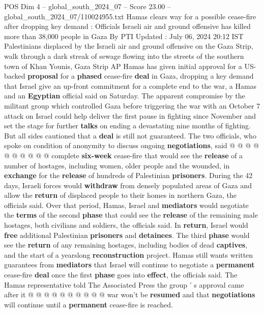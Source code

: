 \begin{textsample}{POS Dim 4 – global\_south\_2024\_07 – Score 23.00 – global\_south\_2024\_07/110024955.txt}  \label{ex:f4_pos_115}
Hamas clears way for a possible cease-fire after dropping key demand : Officials Israeli air and ground offensive has killed more than 38,000 people in Gaza By PTI Updated : July 06, 2024 20:12 IST Palestinians displaced by the Israeli air and ground offensive on the Gaza Strip, walk through a dark streak of sewage flowing into the streets of the southern town of Khan Younis, Gaza Strip AP Hamas has given initial approval for a US-backed \textbf{proposal} for a \textbf{phased} cease-fire \textbf{deal} in Gaza, dropping a key demand that Israel give an up-front commitment for a complete end to the war, a Hamas and an \textbf{Egyptian} official said on Saturday.
The apparent compromise by the militant group which controlled Gaza before triggering the war with an October 7 attack on Israel could help deliver the first pause in fighting since November and set the stage for further \textbf{talks} on ending a devastating nine months of fighting.
But all sides cautioned that a \textbf{deal} is still not guaranteed.
The two officials, who spoke on condition of anonymity to discuss ongoing \textbf{negotiations}, said @ @ @ @ @ @ @ @ @ @ complete \textbf{six-week} cease-fire that would see the \textbf{release} of a number of hostages, including women, older people and the wounded, in \textbf{exchange} for the \textbf{release} of hundreds of Palestinian \textbf{prisoners}.
During the 42 days, Israeli forces would \textbf{withdraw} from densely populated areas of Gaza and allow the \textbf{return} of displaced people to their homes in northern Gaza, the officials said.
Over that period, Hamas, Israel and \textbf{mediators} would negotiate the \textbf{terms} of the second \textbf{phase} that could see the \textbf{release} of the remaining male hostages, both civilians and soldiers, the officials said.
In \textbf{return}, Israel would \textbf{free} additional Palestinian \textbf{prisoners} and \textbf{detainees}.
The third \textbf{phase} would see the \textbf{return} of any remaining hostages, including bodies of dead \textbf{captives}, and the start of a yearslong \textbf{reconstruction} project.
Hamas still wants written guarantees from \textbf{mediators} that Israel will continue to negotiate a \textbf{permanent} cease-fire \textbf{deal} once the first \textbf{phase} goes into \textbf{effect}, the officials said.
The Hamas representative told The Associated Press the group ' s approval came after it @ @ @ @ @ @ @ @ @ @ war won't be \textbf{resumed} and that \textbf{negotiations} will continue until a \textbf{permanent} cease-fire is reached.

\end{textsample}
